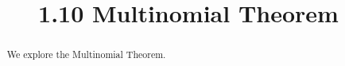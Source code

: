 \documentclass[handout]{ximera}
\title{1.10 Multinomial Theorem}
\begin{document}
\begin{abstract}
We explore the Multinomial Theorem.
\end{abstract}

\maketitle
\end{document}
